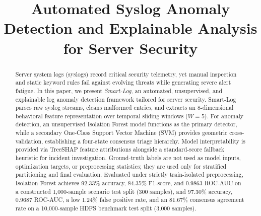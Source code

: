 \documentclass[10pt,conference]{IEEEtran}
\begin{document}
\title{\fontsize{16pt}{19.2pt}\selectfont\bfseries Automated Syslog Anomaly Detection and Explainable Analysis for Server Security}

\author{
}

\maketitle

\begin{abstract}
\normalfont\fontsize{10pt}{12pt}\selectfont
Server system logs (syslogs) record critical security telemetry, yet manual inspection and static keyword rules fail against evolving threats while generating severe alert fatigue. In this paper, we present \emph{Smart-Log}, an automated, unsupervised, and explainable log anomaly detection framework tailored for server security. Smart-Log parses raw syslog streams, cleans malformed entries, and extracts an 8-dimensional behavioral feature representation over temporal sliding windows ($W=5$). For anomaly detection, an unsupervised Isolation Forest model functions as the primary detector, while a secondary One-Class Support Vector Machine (SVM) provides geometric cross-validation, establishing a four-state consensus triage hierarchy. Model interpretability is provided via TreeSHAP feature attributions alongside a standard-score fallback heuristic for incident investigation. Ground-truth labels are not used as model inputs, optimization targets, or preprocessing statistics; they are used only for stratified partitioning and final evaluation. Evaluated under strictly train-isolated preprocessing, Isolation Forest achieves 92.33\% accuracy, 84.35\% F1-score, and 0.9863 ROC-AUC on a constructed 1,000-sample scenario test split (300 samples), and 97.30\% accuracy, 0.9687 ROC-AUC, a low 1.24\% false positive rate, and an 81.67\% consensus agreement rate on a 10,000-sample HDFS benchmark test split (3,000 samples).
\end{abstract}
\end{document}
